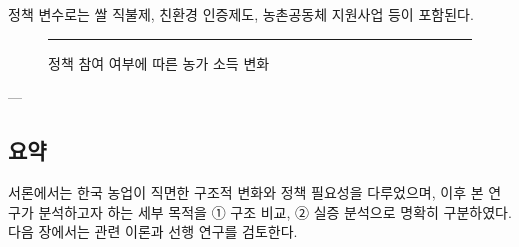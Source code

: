 정책 변수로는 쌀 직불제, 친환경 인증제도, 농촌공동체 지원사업 등이 포함된다.

\begin{figure}[htbp]
  \centering
  \rule{0.65\linewidth}{5cm}
  \caption{정책 참여 여부에 따른 농가 소득 변화}\label{fig:chapter1_3}
\end{figure}

---

\subsection*{요약}\label{subsec:chapter1_2_3}

서론에서는 한국 농업이 직면한 구조적 변화와 정책 필요성을 다루었으며,  
이후 본 연구가 분석하고자 하는 세부 목적을 ① 구조 비교, ② 실증 분석으로 명확히 구분하였다.  
다음 장에서는 관련 이론과 선행 연구를 검토한다.
